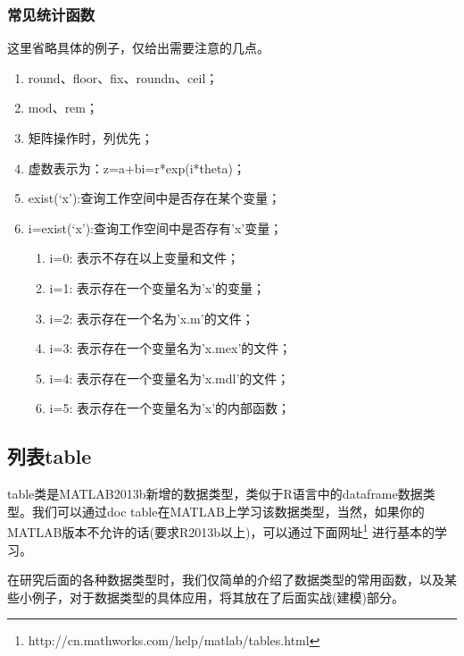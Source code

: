        \subsubsection{常见统计函数}
            这里省略具体的例子，仅给出需要注意的几点。
            \begin{enumerate}
                    \item  round、floor、fix、roundn、ceil；
                    \item mod、rem；
                    \item 矩阵操作时，列优先；
                    \item 虚数表示为：z=a+bi=r*exp(i*theta)；
                    \item exist(‘x’):查询工作空间中是否存在某个变量；
                    \item i=exist(‘x’):查询工作空间中是否存有’x’变量；
              \begin{enumerate}
                    \item i=0: 表示不存在以上变量和文件；
                    \item i=1: 表示存在一个变量名为’x’的变量；
                    \item i=2: 表示存在一个名为’x.m’的文件；
                    \item i=3: 表示存在一个变量名为’x.mex’的文件；
                    \item i=4: 表示存在一个变量名为’x.mdl’的文件；
                    \item i=5: 表示存在一个变量名为’x’的内部函数；
               \end{enumerate}
            \end{enumerate}

    \subsection{列表table}
        \par
        table类是MATLAB2013b新增的数据类型，类似于R语言中的dataframe数据类型。我们可以通过doc table在MATLAB上学习该数据类型，当然，如果你的MATLAB版本不允许的话(要求R2013b以上)，可以通过下面网址\footnote{http://cn.mathworks.com/help/matlab/tables.html} 进行基本的学习。
        \par
        在研究后面的各种数据类型时，我们仅简单的介绍了数据类型的常用函数，以及某些小例子，对于数据类型的具体应用，将其放在了后面实战(建模)部分。
